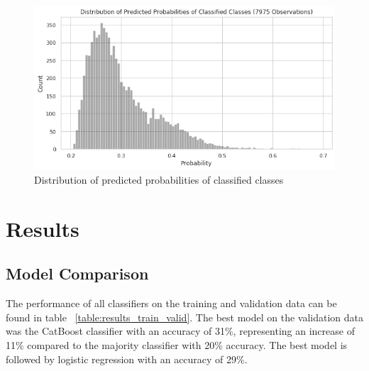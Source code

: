 \documentclass{article}
\begin{document}
	
	\begin{figure}[h!]
		\includegraphics[width=\linewidth]{img/dist_pred_prob.png}
		\caption{Distribution of predicted probabilities of classified classes}
		\label{fig:dist_pred_prob}
	\end{figure}
	
	
	\section{Results}
	
	\subsection{Model Comparison}

	The performance of all classifiers on the training and validation data can be found in table ~\ref{table:results_train_valid}. The best model on the validation data was the CatBoost classifier with an accuracy of 31\%, representing an increase of 11\% compared to the majority classifier with 20\% accuracy. The best model is followed by logistic regression with an accuracy of 29\%.
\end{document}
